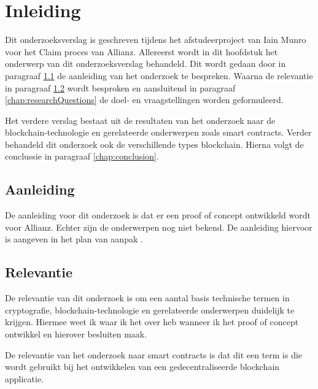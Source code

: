 \chapter{Inleiding}
Dit onderzoeksverslag is geschreven tijdens het afstudeerproject van Iain Munro voor het Claim proces van Allianz. Allereerst wordt in dit hoofdstuk het onderwerp van dit onderzoeksverslag behandeld. Dit wordt gedaan door in paragraaf \ref{chap:motivation} de aanleiding van het onderzoek te bespreken. Waarna de relevantie in paragraaf \ref{chap:relevance} wordt besproken en aansluitend in paragraaf \ref{chap:researchQuestions} de doel- en vraagstellingen worden geformuleerd.\par

Het verdere verslag bestaat uit de resultaten van het onderzoek naar de blockchain-technologie en gerelateerde onderwerpen zoals smart contracts. Verder behandeld dit onderzoek ook de verschillende types blockchain. Hierna volgt de conclussie in paragraaf \ref{chap:conclusion}.

\section{Aanleiding}\label{chap:motivation}
De aanleiding voor dit onderzoek is dat er een proof of concept ontwikkeld wordt voor Allianz. Echter zijn de onderwerpen nog niet bekend. De aanleiding hiervoor is aangeven in het plan van aanpak \cite{pva}.

\section{Relevantie}\label{chap:relevance}
De relevantie van dit onderzoek is om een aantal basis technische termen in cryptografie, blockchain-technologie en gerelateerde onderwerpen duidelijk te krijgen. Hiermee weet ik waar ik het over heb wanneer ik het proof of concept ontwikkel en hierover besluiten maak.\par

De relevantie van het onderzoek naar smart contracts is dat dit een term is die wordt gebruikt bij het ontwikkelen van een gedecentraliseerde blockchain applicatie.

\newpage

